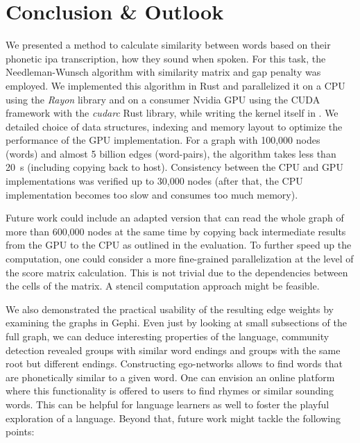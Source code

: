\section{Conclusion \& Outlook}
\label{sec:conclusion}

We presented a method to calculate similarity between words based on their phonetic \gls{ipa} transcription, \ie how they sound when spoken. For this task, the Needleman-Wunsch algorithm with similarity matrix and gap penalty was employed. We implemented this algorithm in Rust and parallelized it on a CPU using the \textit{Rayon} library and on a consumer Nvidia GPU using the CUDA framework with the \textit{cudarc} Rust library, while writing the kernel itself in \Cpp. We detailed choice of data structures, indexing and memory layout to optimize the performance of the GPU implementation. For a graph with 100,000 nodes (words) and almost 5 billion edges (word-pairs), the algorithm takes less than \qty{20}{\s} (including copying back to host). Consistency between the CPU and GPU implementations was verified up to 30,000 nodes (after that, the CPU implementation becomes too slow and consumes too much memory).

Future work could include an adapted version that can read the whole graph of more than 600,000 nodes at the same time by copying back intermediate results from the GPU to the CPU as outlined in the evaluation. To further speed up the computation, one could consider a more fine-grained parallelization at the level of the score matrix calculation. This is not trivial due to the dependencies between the cells of the matrix. A stencil computation approach might be feasible.

We also demonstrated the practical usability of the resulting edge weights by examining the graphs in Gephi. Even just by looking at small subsections of the full graph, we can deduce interesting properties of the language, \eg community detection revealed groups with similar word endings and groups with the same root but different endings. Constructing ego-networks allows to find words that are phonetically similar to a given word. One can envision an online platform where this functionality is offered to users to find rhymes or similar sounding words. This can be helpful for language learners as well to foster the playful exploration of a language. Beyond that, future work might tackle the following points:


